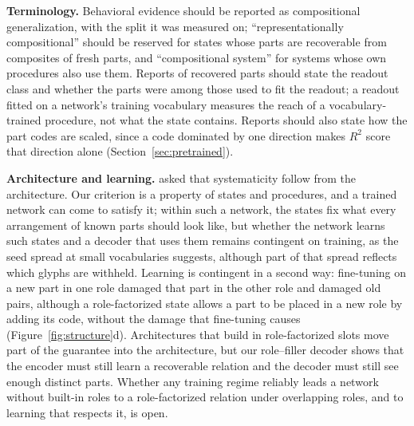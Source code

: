 \documentclass[10pt]{article}
\theoremstyle{plain}
\theoremstyle{remark}
\begin{document}
\textbf{Terminology.} Behavioral evidence should be reported as compositional generalization, with the split it was measured on; ``representationally compositional'' should be reserved for states whose parts are recoverable from composites of fresh parts, and ``compositional system'' for systems whose own procedures also use them. Reports of recovered parts should state the readout class and whether the parts were among those used to fit the readout; a readout fitted on a network's training vocabulary measures the reach of a vocabulary-trained procedure, not what the state contains. Reports should also state how the part codes are scaled, since a code dominated by one direction makes $R^2$ score that direction alone (Section~\ref{sec:pretrained}).

\textbf{Architecture and learning.} \citet{fodor1990} asked that systematicity follow from the architecture. Our criterion is a property of states and procedures, and a trained network can come to satisfy it; within such a network, the states fix what every arrangement of known parts should look like, but whether the network learns such states and a decoder that uses them remains contingent on training, as the seed spread at small vocabularies suggests, although part of that spread reflects which glyphs are withheld. Learning is contingent in a second way: fine-tuning on a new part in one role damaged that part in the other role and damaged old pairs, although a role-factorized state allows a part to be placed in a new role by adding its code, without the damage that fine-tuning causes (Figure~\ref{fig:structure}d). Architectures that build in role-factorized slots move part of the guarantee into the architecture, but our role--filler decoder shows that the encoder must still learn a recoverable relation and the decoder must still see enough distinct parts. Whether any training regime reliably leads a network without built-in roles to a role-factorized relation under overlapping roles, and to learning that respects it, is open.
\end{document}
